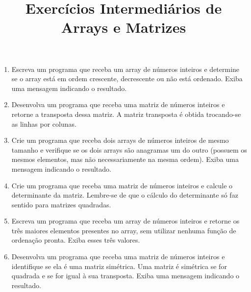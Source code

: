 \documentclass{article}
\title{Exercícios Intermediários de Arrays e Matrizes}
\author{}
\date{}
\begin{document}
\maketitle

\begin{enumerate}
    \item Escreva um programa que receba um array de números inteiros e determine se o array está em ordem crescente, decrescente ou não está ordenado. Exiba uma mensagem indicando o resultado.
    
    \item Desenvolva um programa que receba uma matriz de números inteiros e retorne a transposta dessa matriz. A matriz transposta é obtida trocando-se as linhas por colunas.
    
    \item Crie um programa que receba dois arrays de números inteiros de mesmo tamanho e verifique se os dois arrays são anagramas um do outro (possuem os mesmos elementos, mas não necessariamente na mesma ordem). Exiba uma mensagem indicando o resultado.
    
    \item Crie um programa que receba uma matriz de números inteiros e calcule o determinante da matriz. Lembre-se de que o cálculo do determinante só faz sentido para matrizes quadradas.
    
    \item Escreva um programa que receba um array de números inteiros e retorne os três maiores elementos presentes no array, sem utilizar nenhuma função de ordenação pronta. Exiba esses três valores.
    
    \item Desenvolva um programa que receba uma matriz de números inteiros e identifique se ela é uma matriz simétrica. Uma matriz é simétrica se for quadrada e se for igual à sua transposta. Exiba uma mensagem indicando o resultado.
    
\end{enumerate}
\end{document}
